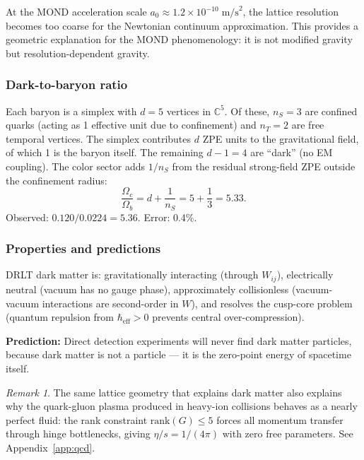 \documentclass[12pt]{article}
\theoremstyle{remark}
\newtheorem{remark}[theorem]{Remark}
\theoremstyle{definition}
\begin{document}
At the MOND acceleration scale $a_0 \approx 1.2 \times 10^{-10}\;\text{m/s}^2$, the lattice resolution becomes too coarse for the Newtonian continuum approximation. This provides a geometric explanation for the MOND phenomenology: it is not modified gravity but resolution-dependent gravity.

\subsubsection{Dark-to-baryon ratio}

Each baryon is a simplex with $d = 5$ vertices in $\mathbb{C}^5$. Of these, $n_S = 3$ are confined quarks (acting as 1 effective unit due to confinement) and $n_T = 2$ are free temporal vertices. The simplex contributes $d$ ZPE units to the gravitational field, of which 1 is the baryon itself. The remaining $d - 1 = 4$ are ``dark'' (no EM coupling). The color sector adds $1/n_S$ from the residual strong-field ZPE outside the confinement radius:
\begin{equation}
\frac{\Omega_c}{\Omega_b} = d + \frac{1}{n_S} = 5 + \frac{1}{3} = 5.33.
\end{equation}
Observed: $0.120/0.0224 = 5.36$. Error: 0.4\%.

\subsubsection{Properties and predictions}

DRLT dark matter is: gravitationally interacting (through $W_{ij}$), electrically neutral (vacuum has no gauge phase), approximately collisionless (vacuum-vacuum interactions are second-order in $W$), and resolves the cusp-core problem (quantum repulsion from $\hbar_\text{eff} > 0$ prevents central over-compression).

\textbf{Prediction:} Direct detection experiments will never find dark matter particles, because dark matter is not a particle --- it is the zero-point energy of spacetime itself.

\begin{remark}
The same lattice geometry that explains dark matter also explains why the quark-gluon plasma produced in heavy-ion collisions behaves as a nearly perfect fluid: the rank constraint $\text{rank}(G) \leq 5$ forces all momentum transfer through hinge bottlenecks, giving $\eta/s = 1/(4\pi)$ with zero free parameters. See Appendix~\ref{app:qcd}.
\end{remark}
\end{document}
